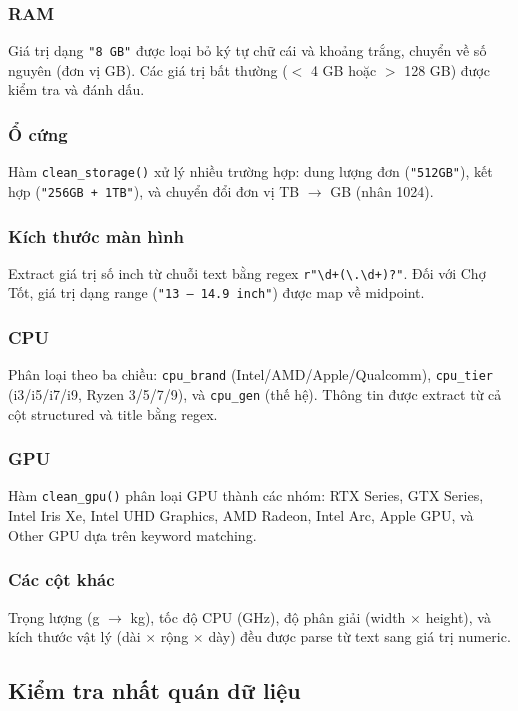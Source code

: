\subsubsection{RAM}
Giá trị dạng \texttt{"8 GB"} được loại bỏ ký tự chữ cái và khoảng trắng, chuyển về số nguyên (đơn vị GB). Các giá trị bất thường ($<$ 4 GB hoặc $>$ 128 GB) được kiểm tra và đánh dấu.

\subsubsection{Ổ cứng}
Hàm \texttt{clean\_storage()} xử lý nhiều trường hợp: dung lượng đơn (\texttt{"512GB"}), kết hợp (\texttt{"256GB + 1TB"}), và chuyển đổi đơn vị TB $\rightarrow$ GB (nhân 1024).

\subsubsection{Kích thước màn hình}
Extract giá trị số inch từ chuỗi text bằng regex \texttt{r"\textbackslash d+(\textbackslash.\textbackslash d+)?"}. Đối với Chợ Tốt, giá trị dạng range (\texttt{"13 -- 14.9 inch"}) được map về midpoint.

\subsubsection{CPU}
Phân loại theo ba chiều: \texttt{cpu\_brand} (Intel/AMD/Apple/Qualcomm), \texttt{cpu\_tier} (i3/i5/i7/i9, Ryzen 3/5/7/9), và \texttt{cpu\_gen} (thế hệ). Thông tin được extract từ cả cột structured và title bằng regex.

\subsubsection{GPU}
Hàm \texttt{clean\_gpu()} phân loại GPU thành các nhóm: RTX Series, GTX Series, Intel Iris Xe, Intel UHD Graphics, AMD Radeon, Intel Arc, Apple GPU, và Other GPU dựa trên keyword matching.

\subsubsection{Các cột khác}
Trọng lượng (g $\rightarrow$ kg), tốc độ CPU (GHz), độ phân giải (width $\times$ height), và kích thước vật lý (dài $\times$ rộng $\times$ dày) đều được parse từ text sang giá trị numeric.

\subsection{Kiểm tra nhất quán dữ liệu}

